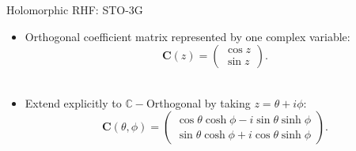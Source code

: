 \documentclass{beamer}
\begin{document}
\begin{frame}{Holomorphic RHF:  STO-3G}
\begin{itemize}
 \item<1->{Orthogonal coefficient matrix represented by one complex variable:
 $$ \mathbf{C}(z) = \left(
  \begin{matrix}
  \cos z \\  \sin z
  \end{matrix} \right). $$\\ }
 \item<1->{Extend explicitly to $\mathbb{C}-$Orthogonal by taking $z = \theta + i \phi$:\\ 
  $$ \mathbf{C}(\theta, \phi) = \left(
  \begin{matrix}
  \cos \theta \cosh \phi - i \sin \theta \sinh \phi \\  
  \sin \theta \cosh \phi  + i \cos \theta \sinh \phi
  \end{matrix} \right). $$}
 \end{itemize}
\end{frame}
\end{document}
